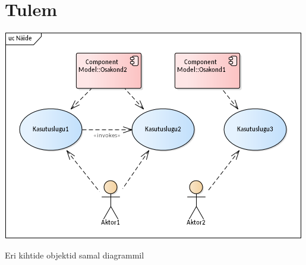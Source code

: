 \documentclass[nobib]{tufte-handout}
\begin{document}
\section{Tulem}
\begin{marginfigure}%
  \includegraphics[width=\linewidth]{kasutuslood.png}
  \caption{Eri kihtide objektid samal diagrammil}
  \label{fig:uc}
\end{marginfigure}
\end{document}
